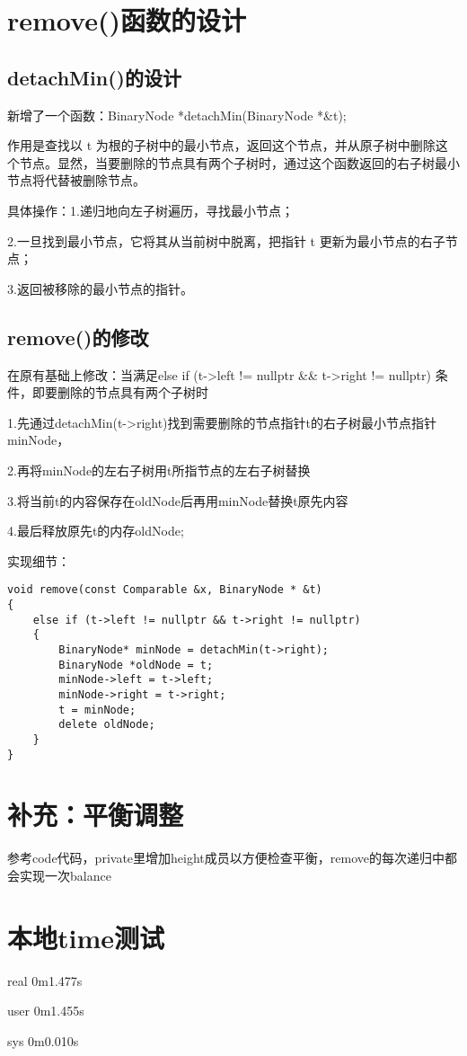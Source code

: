\documentclass[UTF8]{ctexart}
\begin{document}
\pagestyle{fancy}
\fancyhead{}

\section{remove()函数的设计}

\subsection{detachMin()的设计}
新增了一个函数：BinaryNode *detachMin(BinaryNode *\&t);

作用是查找以 t 为根的子树中的最小节点，返回这个节点，并从原子树中删除这个节点。显然，当要删除的节点具有两个子树时，通过这个函数返回的右子树最小节点将代替被删除节点。


具体操作：1.递归地向左子树遍历，寻找最小节点；

2.一旦找到最小节点，它将其从当前树中脱离，把指针 t 更新为最小节点的右子节点；

3.返回被移除的最小节点的指针。


\subsection{remove()的修改}
在原有基础上修改：当满足else if (t->left != nullptr \&\& t->right != nullptr) 条件，即要删除的节点具有两个子树时

1.先通过detachMin(t->right)找到需要删除的节点指针t的右子树最小节点指针minNode，

2.再将minNode的左右子树用t所指节点的左右子树替换

3.将当前t的内容保存在oldNode后再用minNode替换t原先内容

4.最后释放原先t的内存oldNode;

实现细节：

\begin{lstlisting}
void remove(const Comparable &x, BinaryNode * &t) 
{   
    else if (t->left != nullptr && t->right != nullptr) 
    {  
        BinaryNode* minNode = detachMin(t->right);
        BinaryNode *oldNode = t;
        minNode->left = t->left; 
        minNode->right = t->right; 
        t = minNode; 
        delete oldNode; 
    }
}
\end{lstlisting}

\section{补充：平衡调整}
参考code代码，private里增加height成员以方便检查平衡，remove的每次递归中都会实现一次balance

\section{本地time测试}
real    0m1.477s

user    0m1.455s

sys     0m0.010s
\end{document}
